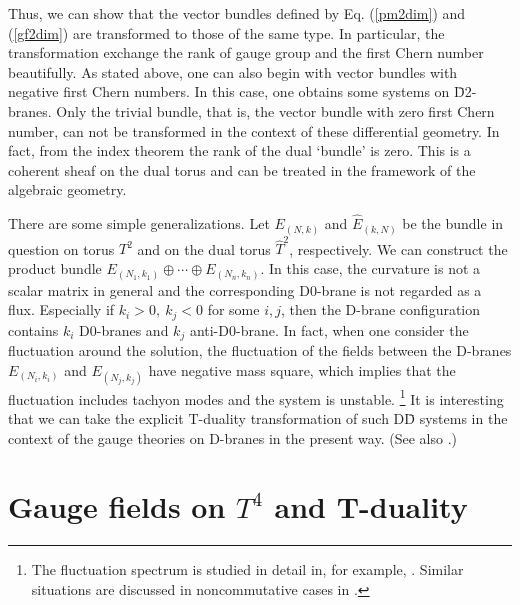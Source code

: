 \documentclass[a4paper,epsf,12pt]{article}
\newcommand{\Th}{\hat{T}}
\def \Eh{\hat{E}}
\begin{document}
Thus, we can show that the vector bundles defined by Eq. (\ref{pm2dim}) and 
(\ref{gf2dim}) are transformed to those of the same type. 
In particular, 
%
the transformation exchange the rank of gauge group
and the first Chern number beautifully.
As stated above, 
one can also begin with vector bundles with negative first Chern numbers. 
In this case, one obtains some systems on \=D2-branes. 
Only the trivial bundle, 
that is, the vector bundle with zero first Chern number, 
can not be transformed in the context of these differential geometry. 
In fact, from the index theorem the rank of the dual `bundle' is zero. 
This is a coherent sheaf on the dual torus and can be treated in the 
framework of the algebraic geometry. 






\vspace{2mm}

There are some simple generalizations.
Let $E_{(N,k)}$ and $\Eh_{(k,N)}$
be the bundle in question 
on torus $T^2$ and on the dual torus $\Th^2$, respectively. 
We can construct 
the product bundle $E_{(N_1,k_1)}\oplus\cdots\oplus E_{(N_n,k_n)}$.
In this case, the curvature is not a scalar matrix in general 
and the corresponding D0-brane is not regarded as a flux.
Especially if $k_i>0,~k_j<0$ for some $i,j$, then
the D-brane configuration contains $k_i$ D0-branes and $k_j$
anti-D0-brane. In fact, 
when one consider the fluctuation around the solution, 
the fluctuation of the fields between the D-branes $E_{(N_i,k_i)}$ and 
$E_{(N_j,k_j)}$ have negative mass square, 
which implies that the fluctuation includes tachyon modes 
and the system is unstable.
\footnote{The fluctuation spectrum is studied in
detail in, for example, \cite{vanBaal2, Troost}. 
Similar situations are discussed in noncommutative cases in \cite{Ko}.} 
It is interesting that we can take the explicit T-duality transformation
of such D\=D systems in the context of the gauge theories on D-branes
in the present way.
(See also \cite{Hori}.)

\section{Gauge fields on $T^4$ and T-duality}
\end{document}
